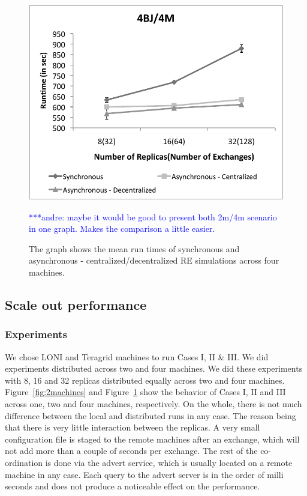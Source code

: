\documentclass[a4paper,10pt]{article}
\newcommand{\alnote}[1]{ {\textcolor{blue} { ***andre: #1 }}}
\newcommand{\alnote}[1]{}
\begin{document}
\begin{figure}
\centering
\includegraphics[scale=0.80]{data/4Machines.pdf}
\caption{\small The graph shows the mean run times of synchronous and asynchronous - centralized/decentralized RE simulations across four machines.}
\alnote{maybe it would be good to present both 2m/4m scenario in one graph. Makes the comparison a little easier.}
\label{fig:4machines}
\vspace{-1em}
\end{figure}

\subsection{Scale out performance}
\subsubsection{Experiments}
We chose LONI and Teragrid machines to run Cases I, II \& III. We did experiments distributed across two and four machines. We did these experiments with 8, 16 and 32 replicas distributed equally across two and four machines. 
Figure~\ref{fig:2machines} and Figure~\ref{fig:4machines} show the behavior of Cases I, II and III across one, two and four machines, respectively. On the whole, there is not much difference between the local and distributed runs in any case. The reason being that there is very little interaction between the replicas. A very small configuration file is staged to the remote machines after an exchange, which will not add more than a couple of seconds per exchange. The rest of the co-ordination is done via the advert service, which is usually located on a remote machine in any case. Each query to the advert server is in the order of milli seconds and does not produce a noticeable effect on the performance. 
\end{document}
